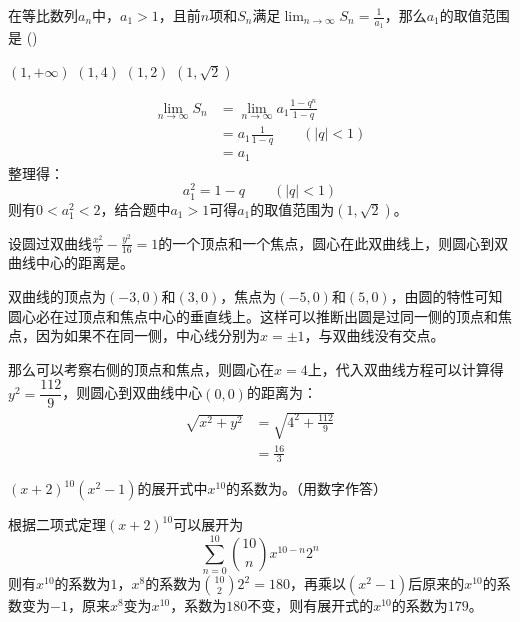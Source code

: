 \documentclass[answers]{exam}
\begin{document}
\begin{questions}
	\question 在等比数列${a_n}$中，$a_1>1$，且前$n$项和$S_n$满足$\displaystyle
		\lim_{n\to\infty}S_n=\frac{1}{a_1}$，那么$a_1$的取值范围是 \hfill (\hspace{1cm})

	\begin{oneparchoices}
		\choice $(1,+\infty)$
		\choice $(1,4)$
		\choice $(1,2)$
		\CorrectChoice $(1,\sqrt{2})$
	\end{oneparchoices}

	\begin{solution}
		\begin{align*}
			\lim_{n\to\infty}S_n & = \lim_{n\to\infty}a_1\frac{1-q^n}{1-q} \\
			                     & = a_1\frac{1}{1-q}\qquad (|q|< 1)       \\
			                     & = a_1
		\end{align*}
		整理得：
		\begin{equation*}
			a_1^2 = 1 - q \qquad (|q|<1)
		\end{equation*}
		则有$0<a_1^2<2$，结合题中$a_1>1$可得$a_1$的取值范围为$(1,\sqrt{2})$。
	\end{solution}

	\question 设圆过双曲线$\frac{x^2}{9} -
		\frac{y^2}{16}=1$的一个顶点和一个焦点，圆心在此双曲线上，则圆心到双曲线中心的距离是\fillin[$\frac{16}{3}$][2cm]。

	\begin{solution}
		双曲线的顶点为$(-3,0)$和$(3,0)$，焦点为$(-5,0)$和$(5,0)$，由圆的特性可知圆心必在过顶点和焦点中心的垂直线上。这样可以推断出圆是过同一侧的顶点和焦点，因为如果不在同一侧，中心线分别为$x=\pm1$，与双曲线没有交点。

		那么可以考察右侧的顶点和焦点，则圆心在$x=4$上，代入双曲线方程可以计算得$y^2=\dfrac{112}{9}$，则圆心到双曲线中心$(0,0)$的距离为：
		\begin{align*}
			\sqrt{x^2 + y^2} & = \sqrt{4^2 + \frac{112}{9}} \\
			                 & = \frac{16}{3}
		\end{align*}
	\end{solution}

	\question $(x+2)^{10}(x^2-1)$的展开式中$x^{10}$的系数为\fillin[179][2cm]。（用数字作答）

	\begin{solution}
		根据二项式定理$(x+2)^{10}$可以展开为
		\begin{equation*}
			\sum_{n=0}^{10}\binom{10}{n}x^{10-n}2^{n}
		\end{equation*}
		则有$x^10$的系数为$1$，$x^8$的系数为$\binom{10}{2}2^2 =
			180$，再乘以$(x^2-1)$后原来的$x^{10}$的系数变为$-1$，原来$x^8$变为$x^{10}$，系数为$180$不变，则有展开式的$x^{10}$的系数为$179$。
	\end{solution}


\end{questions}
\end{document}
